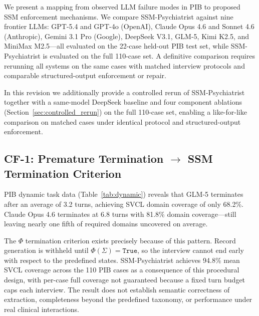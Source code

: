 \documentclass[conference]{IEEEtran}
\begin{document}
We present a mapping from observed LLM failure modes in PIB to proposed SSM enforcement mechanisms. We compare SSM-Psychiatrist against nine frontier LLMs: GPT-5.4 and GPT-4o (OpenAI), Claude Opus 4.6 and Sonnet 4.6 (Anthropic), Gemini 3.1 Pro (Google), DeepSeek V3.1, GLM-5, Kimi K2.5, and MiniMax M2.5---all evaluated on the 22-case held-out PIB test set, while SSM-Psychiatrist is evaluated on the full 110-case set. A definitive comparison requires rerunning all systems on the same cases with matched interview protocols and comparable structured-output enforcement or repair.

In this revision we additionally provide a controlled rerun of SSM-Psychiatrist together with a same-model DeepSeek baseline and four component ablations (Section~\ref{sec:controlled_rerun}) on the full 110-case set, enabling a like-for-like comparison on matched cases under identical protocol and structured-output enforcement.

\subsection{CF-1: Premature Termination $\rightarrow$ SSM Termination Criterion}

PIB dynamic task data (Table~\ref{tab:dynamic}) reveals that GLM-5 terminates after an average of 3.2 turns, achieving SVCL domain coverage of only 68.2\%. Claude Opus 4.6 terminates at 6.8 turns with 81.8\% domain coverage---still leaving nearly one fifth of required domains uncovered on average.

The $\Phi$ termination criterion exists precisely because of this pattern. Record generation is withheld until $\Phi(\Sigma) = \texttt{True}$, so the interview cannot end early with respect to the predefined states. SSM-Psychiatrist achieves 94.8\% mean SVCL coverage across the 110 PIB cases as a consequence of this procedural design, with per-case full coverage not guaranteed because a fixed turn budget caps each interview. The result does not establish semantic correctness of extraction, completeness beyond the predefined taxonomy, or performance under real clinical interactions.
\end{document}

